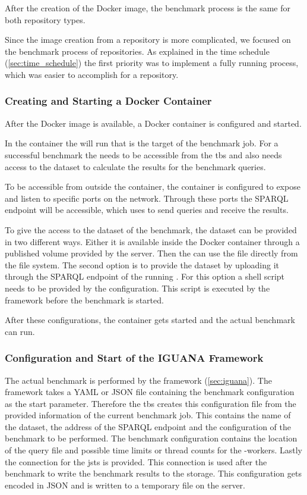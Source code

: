 After the creation of the Docker image, the benchmark process is the same for both repository types.

Since the image creation from a \gh{} repository is more complicated, we focused on the benchmark process of \dockh{} repositories.
As explained in the time schedule (\ref{sec:time_schedule}) the first priority was to implement a fully running process, which was easier to accomplish for a \dockh{} repository.


\subsubsection{Creating and Starting a Docker Container}
After the Docker image is available, a Docker container is configured and started.

In the container the \ts{} will run that is the target of the benchmark job.
For a successful benchmark the \ts{} needs to be accessible from the \ac{tbs} and also needs access to the dataset to calculate the results for the benchmark queries.

To be accessible from outside the container, the container is configured to expose and listen to specific ports on the network.
Through these ports the SPARQL endpoint will be accessible, which \iguana{} uses to send queries and receive the results.

To give the \ts{} access to the dataset of the benchmark, the dataset can be provided in two different ways.
Either it is available inside the Docker container through a published volume provided by the server.
Then the \ts{} can use the file directly from the file system.
The second option is to provide the dataset by uploading it through the SPARQL endpoint of the running \ts{}.
For this option a shell script needs to be provided by the \ts{} configuration.
This script is executed by the \iguana{} framework before the benchmark is started.

After these configurations, the container gets started and the actual benchmark can run.


\subsubsection{Configuration and Start of the IGUANA Framework}
The actual benchmark is performed by the \iguana{} framework (\ref{sec:iguana}).
The framework takes a YAML or JSON file containing the benchmark configuration as the start parameter.
Therefore the \ac{tbs} creates this configuration file from the provided information of the current benchmark job.
This contains the name of the dataset, the address of the SPARQL endpoint and the configuration of the benchmark to be performed.
The benchmark configuration contains the location of the query file and possible time limits or thread counts for the \iguana{}-workers.
Lastly the connection for the \ac{jsts} is provided.
This connection is used after the benchmark to write the benchmark results to the storage.
This configuration gets encoded in JSON and is written to a temporary file on the server.
\\

